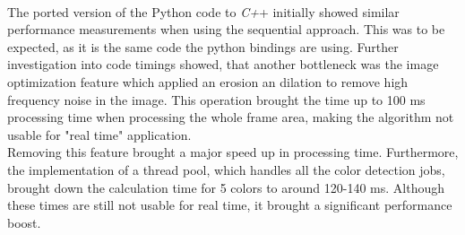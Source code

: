 \\The ported version of the Python code to\textit{ C+}+ initially showed similar performance measurements when using the sequential approach. This was to be expected, as it is the same code the python bindings are using. Further investigation into code timings showed, that another bottleneck was the image optimization feature which applied an erosion an dilation to remove high frequency noise in the image. This operation brought the time up to 100 ms processing time when processing the whole frame area, making the algorithm  not usable for "real time" application. \\Removing this feature brought a major speed up in processing time. 
Furthermore, the implementation of a thread pool, which handles all the color detection jobs, brought down the calculation time for 5 colors to around 120-140 ms. Although these times are still not usable for real time, it brought a significant performance boost.\\
